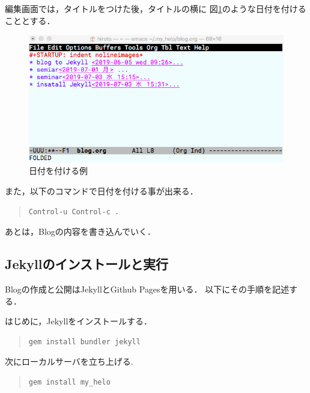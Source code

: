 \documentclass{jsarticle}
\begin{document}
編集画面では，タイトルをつけた後，タイトルの横に
図\ref{fig:org155eebd}のような日付を付けることとする．
\begin{figure}[htbp]
\centering
\includegraphics[width=13cm]{./images/add_date.png}
\caption{\label{fig:org155eebd}
日付を付ける例}
\end{figure}

また，以下のコマンドで日付を付ける事が出来る．
\begin{quote}
\begin{verbatim}
Control-u Control-c .
\end{verbatim}
\end{quote}

あとは，Blogの内容を書き込んでいく．

\subsection{Jekyllのインストールと実行}
\label{sec:org4305693}
Blogの作成と公開はJekyllとGithub Pagesを用いる．
以下にその手順を記述する．

はじめに，Jekyllをインストールする．
\begin{quote}
\begin{verbatim}
gem install bundler jekyll
\end{verbatim}
\end{quote}

次にローカルサーバを立ち上げる.
\begin{quote}
\begin{verbatim}
gem install my_helo
\end{verbatim}
\end{quote}
\end{document}
